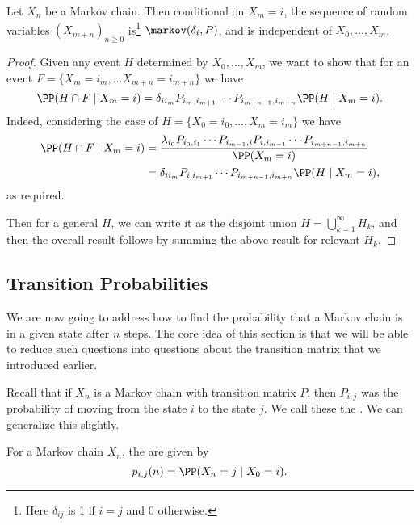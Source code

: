 \documentclass[a4paper]{scrartcl}
\begin{document}
\begin{theorem}
	Let $X_n$ be a Markov chain. Then conditional on $X_m = i$, the sequence of random variables $(X_{m + n})_{n \geq 0}$ is\footnote{Here $\delta_{ij}$ is 1 if $i = j$ and 0 otherwise.} $\markov(\delta_i, P)$, and is independent of $X_0, \dots, X_m$.
\end{theorem}
\begin{proof}
	Given any event $H$ determined by $X_0, \dots, X_m$, we want to show that for an event $F = \{X_m = i_m, \dots X_{m + n} = i_{m +n}\}$ we have
	$$
	\PP(H \cap F \mid X_m = i) = \delta_{ii_m}P_{i_m, i_{m + 1}} \cdots P_{i_{m + n-1}, i_{m + n}} \PP(H \mid X_m = i).
	$$
	Indeed, considering the case of $H = \{X_0 = i_0, \dots, X_m = i_m\}$ we have
	\begin{align*}
		\PP(H \cap F \mid X_m = i) &= \frac{\lambda_{i_0}P_{i_0, i_1} \cdots P_{i_{m - 1}, i}P_{i, i_{m + 1}} \cdots P_{i_{m + n - 1}, i_{m + n}}}{\PP(X_m = i)} \\
		&= \delta_{i i_m}P_{i, i_{m + 1}} \cdots P_{i_{m + n - 1}, i_{m + n}} \PP(H \mid X_m = i),
	\end{align*}
	as required. 
	
	Then for a general $H$, we can write it as the disjoint union $H = \bigcup_{k = 1}^{\infty} H_k$, and then the overall result follows by summing the above result for relevant $H_k$.
\end{proof}

\subsection{Transition Probabilities}

We are now going to address how to find the probability that a Markov chain is in a given state after $n$ steps.
The core idea of this section is that we will be able to reduce such questions into questions about the transition matrix that we introduced earlier.

Recall that if $X_n$ is a Markov chain with transition matrix $P$, then $P_{i, j}$ was the probability of moving from the state $i$ to the state $j$. We call these the . We can generalize this slightly.

\begin{definition}
	For a Markov chain $X_n$, the  are given by
	$$
	p_{i, j}(n) = \PP(X_n = j \mid X_0 = i).
	$$
\end{definition}
\end{document}

